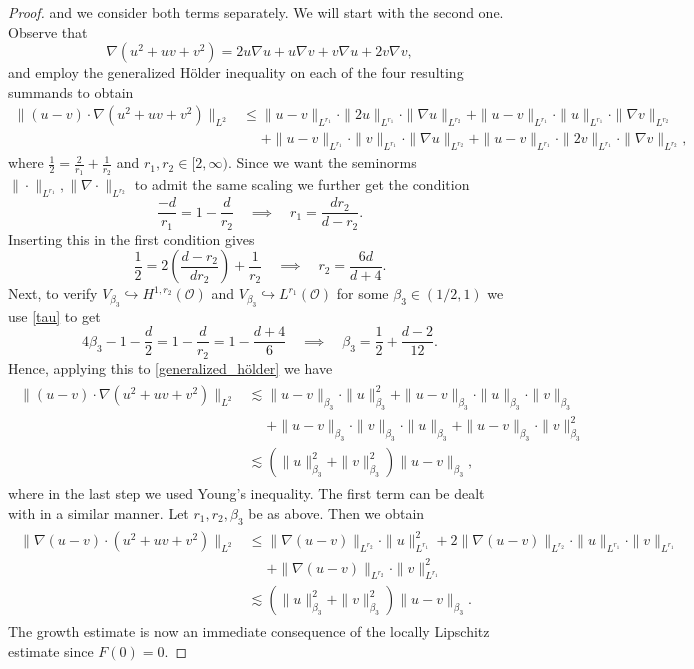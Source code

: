 \documentclass[reqno]{amsart}
\newcommand{\sO}{\mathscr{O}}
\newcommand{\1}{\mathbf{1}}
\begin{document}
\begin{proof}
and we consider both terms separately. We will start with the second one. Observe that
\[\nabla (u^2+uv+v^2)=2u\nabla u+u\nabla v +v\nabla u+2v\nabla v,\]
and employ the generalized Hölder inequality on each of the four resulting summands to obtain
\begin{align}\label{generalized_hölder}
\|  (u-v)\cdot \nabla (u^2+uv+v^2) \|_{L^2}
&\leq \|u-v \|_{L^{r_1}} \cdot \|2u \|_{L^{r_1}}  \cdot \| \nabla u \|_{L^{r_2}}  + \|u-v \|_{L^{r_1}} \cdot \|u \|_{L^{r_1}}  \cdot \| \nabla v\|_{L^{r_2}}  \nonumber\\
  &\phantom{\le }+ \|u-v \|_{L^{r_1}} \cdot \|v \|_{L^{r_1}}  \cdot \| \nabla u\|_{L^{r_2}} + \|u-v \|_{L^{r_1}} \cdot \|2v \|_{L^{r_1}}  \cdot \| \nabla v \|_{L^{r_2}},
\end{align}
where $\frac{1}{2}=\frac{2}{r_1}+\frac{1}{r_2}$ and $r_1,r_2\in [2,\infty)$. Since we want the seminorms $\|\cdot \|_{L^{r_1}}, \| \nabla \cdot \|_{L^{r_2}}$  to admit the same scaling we further get the condition
\[ \frac{-d}{r_1}=1-\frac{d}{r_2} \quad \implies \quad r_1=\frac{dr_2}{d-r_2}.\]
Inserting this in the first condition gives
\[ \frac{1}{2}=2\left( \frac{d-r_2}{dr_2}\right)+\frac{1}{r_2} \quad \implies \quad  r_2=\frac{6d}{d+4}.\]
Next, to verify $V_{\beta_3}\hookrightarrow H^{1,r_2}(\sO)$ 
and  $V_{\beta_3}\hookrightarrow L^{r_1}(\sO)$ for some $\beta_3\in (1/2,1)$ we use \eqref{tau} to get
\[ 4\beta_3-1-\frac{d}{2}=1-\frac{d}{r_2}=1-\frac{d+4}{6} \quad  \implies \quad \beta_3=\frac{1}{2}+\frac{d-2}{12}. \]
Hence, applying this to \eqref{generalized_hölder} we have
\begin{align*}
 \begin{aligned}
\|  (u-v)\cdot \nabla (u^2+uv+v^2) \|_{L^2} &\lesssim \|u-v \|_{\beta_3} \cdot \|u \|_{\beta_3}^2 + \|u-v \|_{\beta_3} \cdot \|u \|_{\beta_3}  \cdot \| v\|_{\beta_3}  \\
  &\phantom{\lesssim }+ \|u-v \|_{\beta_3} \cdot \|v \|_{\beta_3}  \cdot \|  u\|_{\beta_3}  + \|u-v \|_{\beta_3} \cdot \|v \|_{\beta_3}^2\\
  &\lesssim  (\|u \|_{\beta_3}^2+\|v \|_{\beta_3}^2) \|u-v \|_{\beta_3},
\end{aligned}   
\end{align*}
where in the last step we used Young's inequality. The first term can be dealt with in a similar manner. Let $r_1,r_2,\beta_3$ be as above. Then we obtain
\begin{align*}
 \begin{aligned}
\|  \nabla (u-v) \cdot (u^2+uv+v^2) \|_{L^2} &\leq \|\nabla (u-v) \|_{L^{r_2}} \cdot \|u \|_{L^{r_1}}^2 + 2 \|\nabla (u-v) \|_{L^{r_2}}  \cdot \|u \|_{L^{r_1}} \cdot \| v\|_{L^{r_1}} \\
  &\phantom{\le }+ \|\nabla (u-v) \|_{L^{r_2}}  \cdot \|v \|_{L^{r_1}}^2 \\
  &\lesssim (\|u \|_{\beta_3}^2+\|v \|_{\beta_3}^2) \|u-v \|_{\beta_3}.
\end{aligned}   
\end{align*}
The growth estimate is now an immediate consequence of the locally Lipschitz estimate since $F(0)=0$.


\end{proof}
\end{document}
